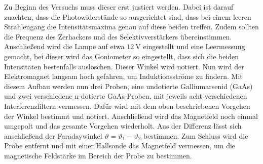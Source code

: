 Zu Beginn des Versuchs muss dieser erst justiert werden. Dabei ist darauf zuachten, dass die Photowiderstände so ausgerichtet sind,
dass bei einem leeren Strahlengang die Intensitätsmaxima genau auf diese beiden treffen. Zudem sollten die Frequenz des Zerhackers und des
Selektivverstärkers übereinstimmen.
Anschließend wird die Lampe auf etwa $\SI{12}{\volt}$ eingestellt und eine Leermessung gemacht, bei dieser wird das Goniometer so eingestellt,
dass sich die beiden Intensitäten bestenfalls auslöschen. Dieser Winkel wird notiert. Nun wird der Elektromagnet langsam hoch gefahren, um
Induktionsströme zu findern.
Mit diesem Aufbau werden nun drei Proben, eine undotierte Galliumarsenid (GaAs) und zwei verschiedene n-dotierte GaAs-Proben, mit jeweils
acht verschiedenen Interferenzfiltern vermessen. Dafür wird mit dem oben beschriebenen Vorgehen der Winkel bestimmt und notiert. Anschließend
wird das Magnetfeld noch einmal umgepolt und das gesamte Vorgehen wiederholt. Aus der Differenz lässt sich anschließend der Faradaywinkel
$\vartheta = \vartheta_1 - \vartheta_2$ bestimmen.
Zum Schluss wird die Probe entfernt und mit einer Hallsonde das Magnetfeld vermessen, um die magnetische Feldstärke im Bereich der Probe zu bestimmen.
